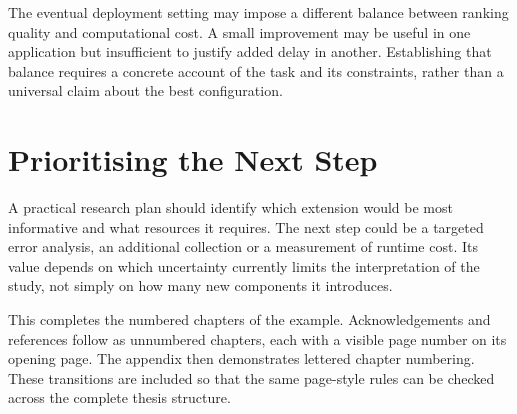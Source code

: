 The eventual deployment setting may impose a different balance between ranking
quality and computational cost. A small improvement may be useful in one
application but insufficient to justify added delay in another. Establishing
that balance requires a concrete account of the task and its constraints,
rather than a universal claim about the best configuration.

\section{Prioritising the Next Step}
A practical research plan should identify which extension would be most
informative and what resources it requires. The next step could be a targeted
error analysis, an additional collection or a measurement of runtime cost.
Its value depends on which uncertainty currently limits the interpretation
of the study, not simply on how many new components it introduces.

This completes the numbered chapters of the example. Acknowledgements and
references follow as unnumbered chapters, each with a visible page number on
its opening page. The appendix then demonstrates lettered chapter numbering.
These transitions are included so that the same page-style rules can be
checked across the complete thesis structure.
